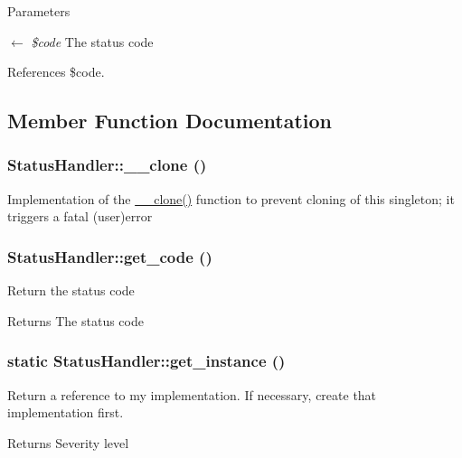 \begin{DoxyParams}{Parameters}
\item[\mbox{$\leftarrow$} {\em \$code}]The status code \end{DoxyParams}


References \$code.



\subsection{Member Function Documentation}
\subsubsection[{\_\-\_\-clone}]{\setlength{\rightskip}{0pt plus 5cm}StatusHandler::\_\-\_\-clone ()}\label{classStatusHandler_ae80418e7b0d469131e909dfcda4ad36e}
Implementation of the \hyperlink{classStatusHandler_ae80418e7b0d469131e909dfcda4ad36e}{\_\-\_\-clone()} function to prevent cloning of this singleton; it triggers a fatal (user)error 
\subsubsection[{get\_\-code}]{\setlength{\rightskip}{0pt plus 5cm}StatusHandler::get\_\-code ()}\label{classStatusHandler_ad39bc4e6a56b6d418a252957da9b4417}
Return the status code

\begin{DoxyReturn}{Returns}
The status code 
\end{DoxyReturn}
\subsubsection[{get\_\-instance}]{\setlength{\rightskip}{0pt plus 5cm}static StatusHandler::get\_\-instance ()}\label{classStatusHandler_a9d291ccaa6b4e6eed931e47025915b0e}
Return a reference to my implementation. If necessary, create that implementation first.

\begin{DoxyReturn}{Returns}
Severity level 
\end{DoxyReturn}


